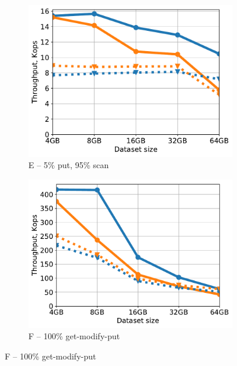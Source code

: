 \begin{figure}[tb]
\begin{subfigure}{0.49\columnwidth}
\includegraphics[width=\textwidth]{figs/Workload_E+_line.pdf}
\caption{E -- 5\% put, 95\% scan}
\label{fig:throughput:e1000}
\end{subfigure}
\begin{subfigure}{0.49\columnwidth}
\includegraphics[width=\textwidth]{figs/Workload_F_line.pdf}
\caption{F -- 100\% get-modify-put}
\label{fig:throughput:f}
\end{subfigure}

\end{figure}
